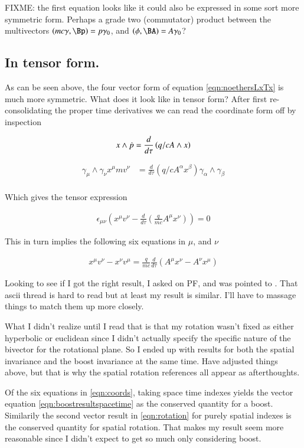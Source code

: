 \documentclass{article}      %
\begin{document}
FIXME: the first equation looks like it could also be expressed in some sort more symmetric form.  Perhaps a grade two (commutator) product between the multivectors $(mc\gamma, \Bp) = p \gamma_0$, and $(\phi, \BA) = A \gamma_0$?

\subsection{ In tensor form. }

As can be seen above, the four vector form of equation \ref{eqn:noethersLxTx} is much more symmetric.  What does it look like in 
tensor form?  After first re-consolidating the proper time derivatives we can read the coordinate form off by inspection

\begin{align*}
x \wedge \dot{p} &= \frac{d}{d\tau} \left( q/c A \wedge x \right) \\
\end{align*}

\begin{align*}
\gamma_\mu \wedge \gamma_\nu x^\mu m v^\nu &= \frac{d}{d\tau} \left( q/c A^\alpha x^\beta \right) \gamma_\alpha \wedge \gamma_\beta \\
\end{align*}

Which gives the tensor expression

\begin{align}
\epsilon_{\mu\nu} \left(x^\mu v^\nu - \frac{d}{d\tau} \left( \frac{q}{mc} A^\mu x^\nu \right) \right) = 0
\end{align}

This in turn implies the following six equations in $\mu$, and $\nu$

\begin{align}\label{eqn:coords}
x^\mu v^\nu - x^\nu v^\mu = \frac{q}{mc} \frac{d}{d\tau} \left( A^\mu x^\nu - A^\nu x^\mu \right)
\end{align}

Looking to see if I got the right result, I asked on PF, and was pointed to 
\cite{BaezBoosts}.
That ascii thread is hard to read but at least my result is similar.  I'll have to massage things to match them up more closely.

What I didn't realize until I read that is that my rotation wasn't fixed as either hyperbolic or euclidean since I didn't actually specify the specific nature of the bivector for the rotational plane.  So I ended up with results for both the spatial invariance and the boost invariance at the same time.  Have adjusted things above, but that is why the spatial rotation references all appear as afterthoughts.

Of the six equations in \ref{eqn:coords}, taking space time indexes 
yields the vector equation \ref{eqn:boostresultspacetime} as the conserved quantity for a boost.  Similarily
the second vector result in \ref{eqn:rotation} for purely spatial indexes is the conserved quantity for spatial rotation.
That makes my result seem more reasonable since I didn't expect to get so much only considering boost.

\end{document}
